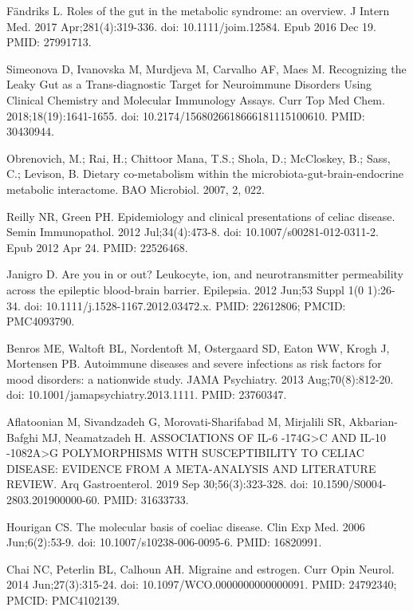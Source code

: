 \documentclass{article}
\begin{document}
\begin{thebibliography}{9}
Fändriks L. Roles of the gut in the metabolic syndrome: an overview. J Intern Med. 2017 Apr;281(4):319-336. doi: 10.1111/joim.12584. Epub 2016 Dec 19. PMID: 27991713.

Simeonova D, Ivanovska M, Murdjeva M, Carvalho AF, Maes M. Recognizing the Leaky Gut as a Trans-diagnostic Target for Neuroimmune Disorders Using Clinical Chemistry and Molecular Immunology Assays. Curr Top Med Chem. 2018;18(19):1641-1655. doi: 10.2174/1568026618666181115100610. PMID: 30430944.

Obrenovich, M.; Rai, H.; Chittoor Mana, T.S.; Shola, D.; McCloskey, B.; Sass, C.; Levison, B. Dietary co-metabolism within the microbiota-gut-brain-endocrine metabolic interactome. BAO Microbiol. 2007, 2, 022.

Reilly NR, Green PH. Epidemiology and clinical presentations of celiac disease. Semin Immunopathol. 2012 Jul;34(4):473-8. doi: 10.1007/s00281-012-0311-2. Epub 2012 Apr 24. PMID: 22526468.

Janigro D. Are you in or out? Leukocyte, ion, and neurotransmitter permeability across the epileptic blood-brain barrier. Epilepsia. 2012 Jun;53 Suppl 1(0 1):26-34. doi: 10.1111/j.1528-1167.2012.03472.x. PMID: 22612806; PMCID: PMC4093790.

Benros ME, Waltoft BL, Nordentoft M, Ostergaard SD, Eaton WW, Krogh J, Mortensen PB. Autoimmune diseases and severe infections as risk factors for mood disorders: a nationwide study. JAMA Psychiatry. 2013 Aug;70(8):812-20. doi: 10.1001/jamapsychiatry.2013.1111. PMID: 23760347.

Aflatoonian M, Sivandzadeh G, Morovati-Sharifabad M, Mirjalili SR, Akbarian-Bafghi MJ, Neamatzadeh H. ASSOCIATIONS OF IL-6 -174G>C AND IL-10 -1082A>G POLYMORPHISMS WITH SUSCEPTIBILITY TO CELIAC DISEASE: EVIDENCE FROM A META-ANALYSIS AND LITERATURE REVIEW. Arq Gastroenterol. 2019 Sep 30;56(3):323-328. doi: 10.1590/S0004-2803.201900000-60. PMID: 31633733.

Hourigan CS. The molecular basis of coeliac disease. Clin Exp Med. 2006 Jun;6(2):53-9. doi: 10.1007/s10238-006-0095-6. PMID: 16820991.

Chai NC, Peterlin BL, Calhoun AH. Migraine and estrogen. Curr Opin Neurol. 2014 Jun;27(3):315-24. doi: 10.1097/WCO.0000000000000091. PMID: 24792340; PMCID: PMC4102139.


\end{thebibliography}
\end{document}
